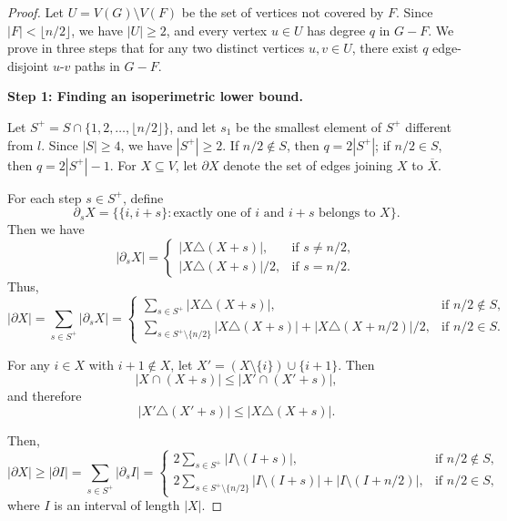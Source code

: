 \documentclass{article}
\begin{document}
\begin{proof}
Let \(U = V(G) \setminus V(F)\) be the set of vertices not covered by \(F\). Since \(|F| < \lfloor n/2 \rfloor\), we have \(|U| \ge 2\), and every vertex \(u \in U\) has degree \(q\) in \(G-F\). We prove in three steps that for any two distinct vertices \(u, v \in U\), there exist \(q\) edge-disjoint \(u\)-\(v\) paths in \(G-F\).

\textbf{Step 1: Finding an isoperimetric lower bound.}

Let \(S^+ = S \cap \{1,2,\dots,\lfloor n/2\rfloor\}\), and let \(s_1\) be the smallest element of \(S^+\) different from \(l\). Since \(|S|\ge 4\), we have \(|S^+|\ge 2\). If \(n/2 \notin S\), then \(q = 2|S^+|\); if \(n/2 \in S\), then \(q = 2|S^+|-1\). For \(X \subseteq V\), let \(\partial X\) denote the set of edges joining \(X\) to \(\overline{X}\).

For each step \(s\in S^+\), define
\[
\partial_s X = \bigl\{\{i,i+s\}: \text{exactly one of } i \text{ and } i+s \text{ belongs to } X\bigr\}.
\]
Then we have
\[
|\partial_s X| =\begin{cases}
\bigl|X \triangle (X+s)\bigr|, & \text{if } s\neq n/2,\\[4pt]
\bigl|X \triangle (X+s)\bigr|\Big/2, & \text{if } s= n/2.
\end{cases}
\]
Thus,
\[
|\partial X|=\sum_{s\in S^+} |\partial_s X|=
\begin{cases}
\sum\limits_{s\in S^+}\bigl|X \triangle (X+s)\bigr|, & \text{if } n/2\notin S,\\[4pt]
\sum\limits_{s\in S^+\setminus\{n/2\}}\bigl|X \triangle (X+s)\bigr|+\bigl|X \triangle (X+n/2)\bigr|\Big/2, & \text{if } n/2\in S.
\end{cases}
\]

For any \(i\in X\) with \(i+1\notin X\), let \(X'=(X\setminus\{i\})\cup\{i+1\}\). Then
\[
\bigl|X\cap(X+s)\bigr|\leq\bigl| X'\cap(X'+s)\bigr|,
\]
and therefore
\[
\bigl|X' \triangle (X'+s)\bigr|\leq\bigl|X \triangle (X+s)\bigr|.
\]

Then,
\[
|\partial X|\geq|\partial I|=\sum_{s\in S^+} |\partial_s I|=
\begin{cases}
2\sum\limits_{s\in S^+}\bigl|I \setminus (I+s)\bigr|, & \text{if } n/2\notin S,\\[4pt]
2\sum\limits_{s\in S^+\setminus\{n/2\}}\bigl|I \setminus (I+s)\bigr|+\bigl|I \setminus (I+n/2)\bigr|, & \text{if } n/2\in S,
\end{cases}
\]
where \(I\) is an interval of length \(|X|\).


\end{proof}
\end{document}
